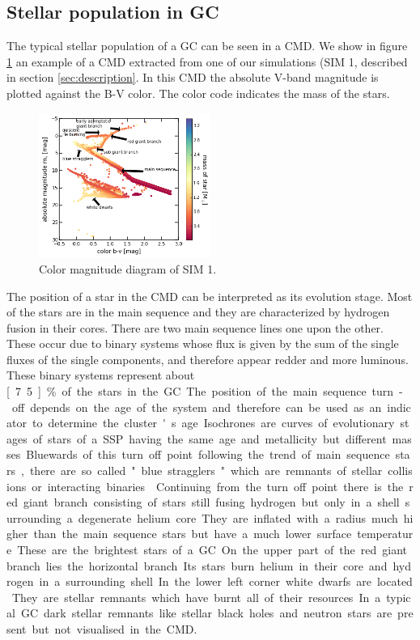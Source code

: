 \subsection{Stellar population in GC}\label{sec:cmd_theory}
The typical stellar population of a \ac{GC} can be seen in a \ac{CMD}. We show in figure \ref{fig:cmd} an example of a \ac{CMD} extracted from one of our simulations (SIM 1, described in section \ref{sec:description}. In this \ac{CMD} the absolute V-band magnitude is plotted against the B-V color. The color code indicates the mass of the stars. 
\begin{figure}[htbp]
\centering
	\includegraphics[width=0.5\textwidth]{Plots/color_magnitude_diagram.png}
	\caption{Color magnitude diagram of SIM 1.}
	\label{fig:cmd}
\end{figure}
The position of a star in the \ac{CMD} can be interpreted as its evolution stage. Most of the stars are in the main sequence and they are characterized by hydrogen fusion in their cores. There are two main sequence lines one upon the other. These occur due to binary systems whose flux is given by the sum of the single fluxes of the single components, and therefore appear redder and more luminous. These binary systems represent about \unit[7.5]{\%} of the stars in the \ac{GC}. The position of the main sequence turn-off depends on the age of the system and therefore can be used as an indicator to determine the cluster's age. Isochrones are curves of evolutionary stages of stars of a \ac{SSP} having the same age and metallicity but different masses. Bluewards of this turn off point following the trend of main sequence stars, there are so called "blue stragglers" which are remnants of stellar collisions or interacting binaries \citep[p.628]{2008gady.book.....B}. Continuing from the turn off point there is the red giant branch consisting of stars still fusing hydrogen but only in a shell surrounding a degenerate helium core. They are inflated with a radius much higher than the main sequence stars but have a much lower surface temperature. These are the brightest stars of a \ac{GC}. On the upper part of the red giant branch lies the horizontal branch. Its stars burn helium in their core and hydrogen in a surrounding shell. In the lower left corner white dwarfs are located. They are stellar remnants which have burnt all of their resources. In a typical \ac{GC} dark stellar remnants like stellar black holes and neutron stars are present but not visualised in the \ac{CMD}. 
